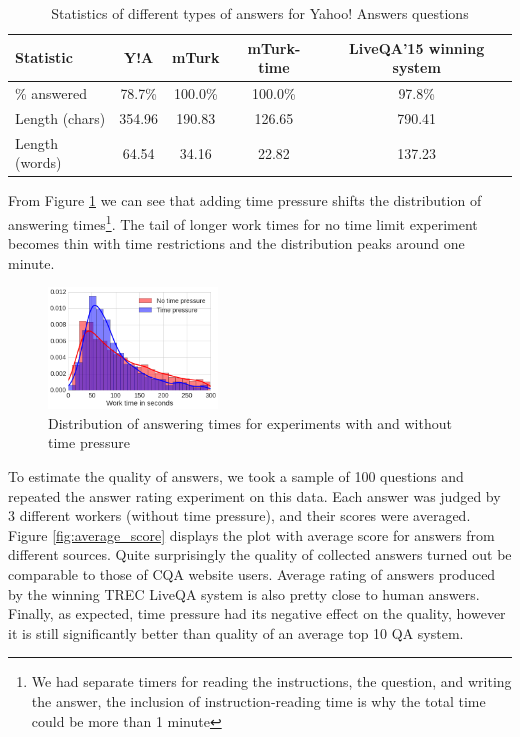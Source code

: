 \documentclass[11pt,letterpaper]{article}
\begin{document}
\begin{table}[ht]
\centering
\caption{Statistics of different types of answers for Yahoo! Answers questions}
\begin{tabular}{| p{3cm} | c | c | c | c |}
\hline
Statistic & Y!A & mTurk & mTurk-time & LiveQA'15 winning system\\
\hline
\% answered & 78.7\% & 100.0\% & 100.0\% & 97.8\% \\
Length (chars) & 354.96 & 190.83 & 126.65 & 790.41 \\
Length (words) & 64.54 & 34.16 & 22.82 & 137.23 \\
\hline
\end{tabular}
\label{table:answer_stats}
\vspace{-0.3cm}
\end{table}

From Figure \ref{fig:answering_time_distribution} we can see that adding time pressure shifts the distribution of answering times\footnote{We had separate timers for reading the instructions, the question, and writing the answer, the inclusion of instruction-reading time is why the total time could be more than 1 minute}.
The tail of longer work times for no time limit experiment becomes thin with time restrictions and the distribution peaks around one minute.

\begin{figure}[t!]
	\centering
	\includegraphics[width=0.4\textwidth]{img/answering_time_distribution}
	\caption{Distribution of answering times for experiments with and without time pressure}
	\label{fig:answering_time_distribution}
\end{figure}

To estimate the quality of answers, we took a sample of 100 questions and repeated the answer rating experiment on this data.
Each answer was judged by 3 different workers (without time pressure), and their scores were averaged.
Figure \ref{fig:average_score} displays the plot with average score for answers from different sources.
Quite surprisingly the quality of collected answers turned out be comparable to those of CQA website users.
Average rating of answers produced by the winning TREC LiveQA system is also pretty close to human answers.
Finally, as expected, time pressure had its negative effect on the quality, however it is still significantly better than quality of an average top 10 QA system.
\end{document}

